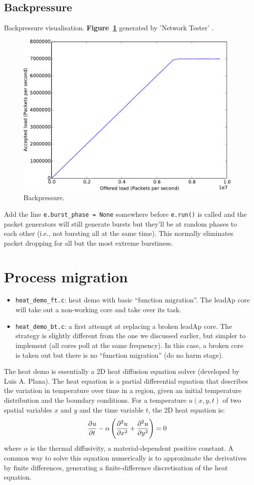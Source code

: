 \documentclass[a4paper, 11pt]{article}
\newlength\drop
\begin{document}
\clearpage
\subsection{Backpressure}
Backpressure visualisation. \textbf{Figure~\ref{fig:backpressure}} generated by 'Network Tester' \citep[see][]{heathcote2015networktester}.
\begin{figure}[htbp]
	\centering
	\includegraphics[width=0.5\linewidth]{images/backpressure2.pdf}
	\caption{Backpressure.}	
	\label{fig:backpressure}
\end{figure}

Add the line \verb|e.burst_phase = None| somewhere before \verb|e.run()| is called and the packet generators will still generate bursts but they'll be at random phases to each other (i.e., not bursting all at the same time). This normally eliminates packet dropping for all but the most extreme burstiness.

\clearpage
\section{Process migration}
\label{sec:migration}

\begin{itemize}
\item \verb|heat_demo_ft.c|:  heat demo with basic ``function migration''. The leadAp core will take out a non-working core and take over its task.

\item \verb|heat_demo_bt.c|: a first attempt at replacing a broken leadAp core. The strategy is slightly different from the one we discussed earlier, but simpler to implement (all cores poll at the same frequency). In this case, a broken core is taken out but there is no ``function migration'' (do no harm stage).
\end{itemize}

The heat demo is essentially a 2D heat diffusion equation solver (developed by Luis A. Plana). The heat equation is a partial differential equation that describes the variation in temperature over time in a region, given an initial temperature distribution and the boundary conditions. For a temperature $u(x,y,t)$ of two spatial variables $x$ and $y$ and the time variable $t$, the 2D heat equation is:
\[
\dpd{u}{t} -\alpha\left( \dpd[2]{u}{x} + \dpd[2]{u}{y} \right) = 0 
\]
where $\alpha$ is the thermal diffusivity, a material-dependent positive constant. A common way to solve this equation numerically is to approximate the derivatives by finite differences, generating a finite-difference discretisation of the heat equation.
\end{document}
